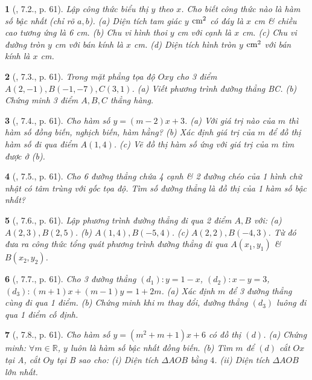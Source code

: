 \documentclass{article}
\newtheorem{baitoan}{}
\begin{document}
\begin{baitoan}[\cite{Binh_boi_duong_Toan_9_tap_1}, 7.2., p. 61]
	Lập công thức biểu thị $y$ theo $x$. Cho biết công thức nào là hàm số bậc nhất (chỉ rõ $a,b$). (a) Diện tích tam giác $y$ $\rm cm^2$ có đáy là $x$ {\rm cm} \& chiều cao tương ứng là {\rm6 cm}. (b) Chu vi hình thoi $y$ {\rm cm} với cạnh là $x$ {\rm cm}. (c) Chu vi đường tròn $y$ {\rm cm} với bán kính là $x$ {\rm cm}. (d) Diện tích hình tròn $y$ $\rm cm^2$ với bán kính là $x$ {\rm cm}.
\end{baitoan}

\begin{baitoan}[\cite{Binh_boi_duong_Toan_9_tap_1}, 7.3., p. 61]
	Trong mặt phẳng tọa độ $Oxy$ cho 3 điểm $A(2,-1),B(-1,-7),C(3,1)$. (a) Viết phương trình đường thẳng BC. (b) Chứng minh 3 điểm $A,B,C$ thẳng hàng.
\end{baitoan}

\begin{baitoan}[\cite{Binh_boi_duong_Toan_9_tap_1}, 7.4., p. 61]
	Cho hàm số $y = (m - 2)x + 3$. (a) Với giá trị nào của $m$ thì hàm số đồng biến, nghịch biến, hàm hằng? (b) Xác định giá trị của $m$ để đồ thị hàm số đi qua điểm $A(1,4)$. (c) Vẽ đồ thị hàm số ứng với giá trị của $m$ tìm được ở (b).
\end{baitoan}

\begin{baitoan}[\cite{Binh_boi_duong_Toan_9_tap_1}, 7.5., p. 61]
	Cho 6 đường thẳng chứa 4 cạnh \& 2 đường chéo của 1 hình chữ nhật có tâm trùng với gốc tọa độ. Tìm số đường thẳng là đồ thị của 1 hàm số bậc nhất?
\end{baitoan}

\begin{baitoan}[\cite{Binh_boi_duong_Toan_9_tap_1}, 7.6., p. 61]
	Lập phương trình đường thẳng đi qua 2 điểm $A,B$ với: (a) $A(2,3),B(2,5)$. (b) $A(1,4),B(-5,4)$. (c) $A(2,2),B(-4,3)$. Từ đó đưa ra công thức tổng quát phương trình đường thẳng đi qua $A(x_1,y_1)$ \& $B(x_2,y_2)$.
\end{baitoan}

\begin{baitoan}[\cite{Binh_boi_duong_Toan_9_tap_1}, 7.7., p. 61]
	Cho 3 đường thẳng $(d_1):y = 1 - x$, $(d_2):x - y = 3$, $(d_3):(m + 1)x + (m - 1)y = 1 + 2m$. (a) Xác định $m$ để 3 đường thẳng cùng đi qua 1 điểm. (b) Chứng minh khi $m$ thay đổi, đường thẳng $(d_3)$ luông đi qua 1 điểm cố định.
\end{baitoan}

\begin{baitoan}[\cite{Binh_boi_duong_Toan_9_tap_1}, 7.8., p. 61]
	Cho hàm số $y = (m^2 + m + 1)x + 6$ có đồ thị $(d)$. (a) Chứng minh: $\forall m\in\mathbb{R}$, $y$ luôn là hàm số bậc nhất đồng biến. (b) Tìm $m$ để $(d)$ cắt $Ox$ tại A, cắt $Oy$ tại B sao cho: (i) Diện tích $\Delta AOB$ bằng $4$. (ii) Diện tích $\Delta AOB$ lớn nhất.
\end{baitoan}
\end{document}
